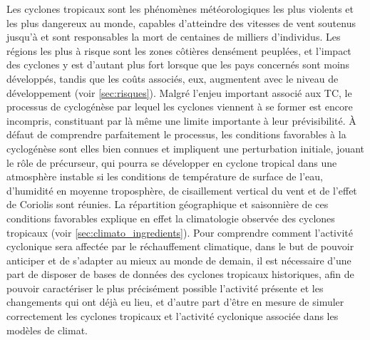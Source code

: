\documentclass[../main.tex]{subfiles}
\begin{document}
Les cyclones tropicaux sont les phénomènes météorologiques les plus violents et les plus dangereux au monde, capables d'atteindre des vitesses de vent soutenus
jusqu'à  et sont responsables la mort de centaines de milliers d'individus. Les régions les plus à risque sont les zones côtières densément peuplées,
et l'impact des cyclones y est d'autant plus fort lorsque que les pays concernés sont moins développés, tandis que les coûts associés, eux, augmentent avec le
niveau de développement (voir \cref{sec:risques}). Malgré l'enjeu important associé aux TC, le processus de cyclogénèse par lequel les cyclones viennent à se
former est encore incompris, constituant par là même une limite importante à leur prévisibilité. À défaut de comprendre parfaitement le processus, les
conditions favorables à la cyclogénèse sont elles bien connues et impliquent une perturbation initiale, jouant le rôle de précurseur, qui pourra se développer
en cyclone tropical dans une atmosphère instable si les conditions de température de surface de l'eau, d'humidité en moyenne troposphère, de cisaillement
vertical du vent et de l'effet de Coriolis sont réunies. La répartition géographique et saisonnière de ces conditions favorables explique en effet la
climatologie observée des cyclones tropicaux (voir \cref{sec:climato_ingredients}). Pour comprendre comment l'activité cyclonique sera affectée par le
réchauffement climatique, dans le but de pouvoir anticiper et de s'adapter au mieux au monde de demain, il est nécessaire d'une part de disposer de bases de
données des cyclones tropicaux historiques, afin de pouvoir caractériser le plus précisément possible l'activité présente et les changements qui ont déjà eu
lieu, et d'autre part d'être en mesure de simuler correctement les cyclones tropicaux et l'activité cyclonique associée dans les modèles de climat.
\end{document}
